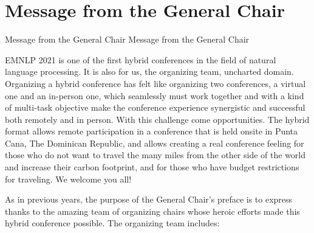 \section{Message from the General Chair}\vspace{2em}
\setheaders%
    {Message from the General Chair}%
    {Message from the General Chair}
\thispagestyle{emptyheader}

\setlength{\parskip}{1ex}

EMNLP 2021 is one of the first hybrid conferences in the field of natural language processing. It is also for us, the organizing team, uncharted domain. Organizing a hybrid conference has felt like organizing two conferences, a virtual one and an in-person one, which seamlessly must work together and with a kind of multi-task objective make the conference experience synergistic and successful both remotely and in person. With this challenge come opportunities. The hybrid format allows remote participation in a conference that is held onsite in Punta Cana, The Dominican Republic, and allows creating a real conference feeling for those who do not want to travel the many miles from the other side of the world and increase their carbon footprint, and for those who have budget restrictions for traveling. We welcome you all!

As in previous years, the purpose of the General Chair's preface is to express thanks to the amazing team of organizing chairs whose heroic efforts made this hybrid conference possible. The organizing team includes:

